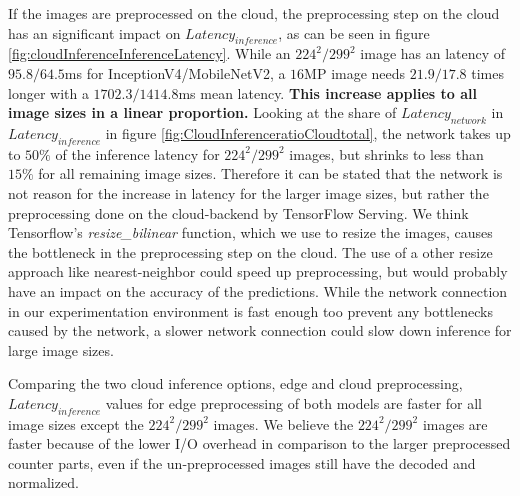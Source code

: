 If the images are preprocessed on the cloud, the preprocessing step on the cloud has an significant impact on $Latency_{inference}$, as can be seen in figure \ref{fig:cloudInferenceInferenceLatency}.
While an $224^2/299^2$ image has an latency of $95.8/64.5$ms for InceptionV4/MobileNetV2, a $16$MP image needs $21.9/17.8$ times longer with a $1702.3/1414.8$ms mean latency.
\textbf{This increase applies to all image sizes in a linear proportion.}
Looking at  the share of $Latency_{network}$ in $Latency_{inference}$ in figure \ref{fig:CloudInferenceratioCloudtotal}, the network takes up to $50\%$ of the inference latency for $224^2/299^2$ images, but shrinks to less than $15\%$ for all remaining image sizes.
Therefore it can be stated that the network is not reason for the increase in latency for the larger image sizes, but rather the preprocessing done on the cloud-backend by TensorFlow Serving.
We think Tensorflow's \emph{resize\_bilinear} function, which we use to resize the images, causes the bottleneck in the preprocessing step on the cloud.%
The use of a other resize approach like nearest-neighbor could speed up preprocessing, but would probably have an impact on the accuracy of the predictions.
While the network connection in our experimentation environment is fast enough too prevent any bottlenecks caused by the network, a slower network connection could slow down inference for large image sizes.

Comparing the two cloud inference options, edge and cloud preprocessing,  $Latency_{inference}$ values for edge preprocessing of both models are faster for all image sizes except the $224^2/299^2$ images.
We believe the $224^2/299^2$ images are faster because of the lower I/O overhead in comparison to the larger preprocessed counter parts, even if the un-preprocessed images still have the decoded and normalized.


